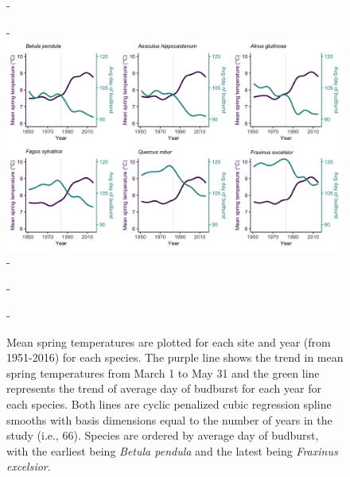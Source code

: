 \documentclass{article}\usepackage[]{graphicx}\usepackage[]{color}
\begin{document}
  \renewcommand{\thefigure}{S1}
  {\begin{figure} [H]
  -\begin{center}
  -\includegraphics[width=16cm]{..//analyses/figures/MSTBB_bySpp_lines.png}
  -\caption{Mean spring temperatures are plotted for each site and year (from 1951-2016) for each species. The purple line shows the trend in mean spring temperatures from March 1 to May 31 and the green line represents the trend of average day of budburst for each year for each species. Both lines are cyclic penalized cubic regression spline smooths with basis dimensions equal to the number of years in the study (i.e., 66). Species are ordered by average day of budburst, with the earliest being \textit{Betula pendula} and the latest being \textit{Fraxinus excelsior}. }\label{fig:mst}
  -\end{center}
  -\end{figure}}
\end{document}
